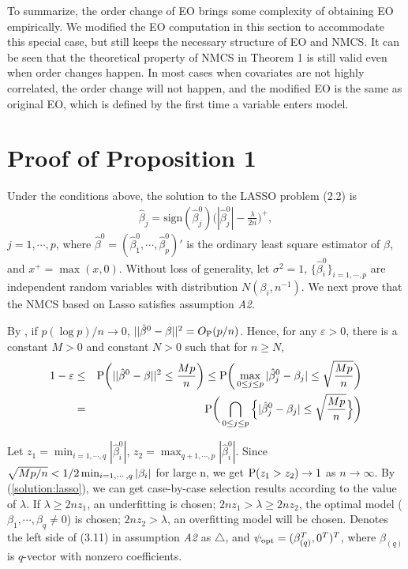 \documentclass[10pt]{book}
\theoremstyle{definition}
\begin{document}
To summarize, the order change of EO brings some complexity of obtaining EO empirically. We modified the EO computation in this section to accommodate this special case, but still keeps the necessary structure of EO and NMCS. It can be seen that the theoretical property of NMCS in Theorem 1 is still valid even when order changes happen. In most cases when covariates are not highly correlated, the order change will not happen, and the modified EO is the same as original EO, which is defined by the first time a variable enters model.

\section{Proof of Proposition 1}
Under the conditions above, the solution to the LASSO problem (2.2) is 
 \begin{eqnarray}
 \hat{\beta}_j =\text{sign}(\hat{\beta}_j^0)\bigg(|\hat{\beta}_j^0|-\frac{\lambda}{2n}\bigg)^+,\label{solution:lasso}
 \end{eqnarray}
 $j=1, \cdots, p$, where $\hat{\beta}^0= (\hat{\beta}_1^0, \cdots, \hat{\beta}_{p}^0)'$ is the ordinary least square estimator of $\beta$, and $x^+ = \max(x,0)$. Without loss of generality, let $\sigma^2=1$, $\{\hat{\beta}_i^0\}_{i= 1,\cdots, p}$ are independent random variables with distribution $N({\beta}_i, n^{-1})$. We next prove that the NMCS based on Lasso satisfies assumption {\it A2}.
 
 By \citet{portnoy}, if $p(\log p)/n \rightarrow 0$, $||\hat{\beta}^0-\beta||^2=O_{\rm P}(p/n)$. Hence, for any $\varepsilon >0$, there is a constant $M>0$ and constant $N>0$ such that for $n \geq N$,
 \begin{eqnarray}
 1-\varepsilon &\leq& {\rm P}\bigg(||\hat{\beta}^0-\beta||^2 \leq \frac{Mp}{n}\bigg)\leq {\rm P}\bigg(\max_{0\leq j \leq p}|\hat{\beta}_j^0-\beta_j|\leq \sqrt{\frac{Mp}{n}}\bigg)\nonumber\\
&=& {\rm P}\bigg(\bigcap_{0\leq j \leq p}\Big\{|\hat{\beta}_j^0-\beta_j|\leq \sqrt{\frac{Mp}{n}}\Big\}\bigg)\label{ols}
 \end{eqnarray}

Let $z_1=\min_{i=1,\cdots,q}|\hat{\beta}^0_i|$, $z_2=\max_{q+1, \cdots,p} |\hat{\beta}^0_i|$.
Since  $\sqrt{Mp/n}\\< 1/2 \min_{i=1, \cdots, q}|\beta_i|$ for large n, we get ${\rm P}(z_1>z_2)\rightarrow 1$ as $n \rightarrow \infty$. By (\ref{solution:lasso}), we can get case-by-case selection results according to the value of $\lambda$. If $\lambda  \geq 2n z_1$, an underfitting is chosen;  $2nz_1>\lambda \geq 2nz_2$, the optimal model ($\beta_1, \cdots, \beta_q \neq 0$) is chosen; $2n z_2>\lambda$, an overfitting model will be chosen. Denotes the left side of (3.11) in assumption {\it A2} as $\triangle$, and $\psi_{\rm opt}=(\beta_{(q)}^T, 0^T)^T$, where $\beta_{(q)}$ is $q$-vector with nonzero coefficients.
 
\end{document}
